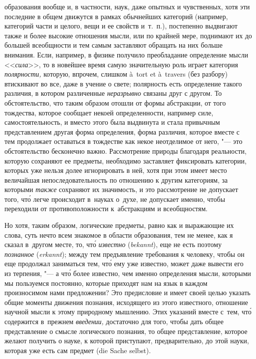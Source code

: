образования вообще и, в частности, наук, даже опытных и чувственных, хотя эти
последние в общем движутся в рамках обычнейших категорий (например, категорий
части и целого, вещи и ее свойств и~т.~п.), постепенно выдвигают также и более
высокие отношения мысли, или по крайней мере, поднимают их до большей
всеобщности и тем самым заставляют обращать на них больше внимания. Если,
например, в физике получило преобладание определение мысли <<{\em сила}>>, то в
новейшее время самую значительную роль играет категория {\em полярности,}
которую, впрочем, слишком à~tort et à~travers (без разбору) втискивают во все,
даже в учение о свете; полярность есть определение такого различия, в
котором различенные {\em неразрывно} связаны друг с другом. То обстоятельство,
что таким образом отошли от формы абстракции, от того тождества, которое
сообщает некоей определенности, например силе, самостоятельность, и вместо
этого была выдвинута и стала привычным представлением другая форма определения,
форма различия, которое вместе с тем продолжает оставаться в тождестве как
некое неотделимое от него, "--- это обстоятельство бесконечно важно.
Рассмотрение природы благодаря реальности, которую сохраняют ее предметы,
необходимо заставляет фиксировать категории, которых уже нельзя долее
игнорировать в ней, хотя при этом имеет место величайшая непоследовательность
по отношению к другим категориям, за которыми {\em также} сохраняют их
значимость, и это рассмотрение не допускает того, чт\'{о} легче происходит
в~науках о~духе, не допускает именно, чтобы переходили от противоположности
к~абстракциям и всеобщностям.

Но хотя, таким образом, логические предметы, равно как и выражающие их слова,
суть нечто всем знакомое в области образования, тем не менее, как я сказал
в~другом месте, то,
чт\'{о} {\em известно} ({\em bekannt}), еще не есть поэтому {\em познанное}
({\em erkannt}); между тем предъявление требования к человеку, чтобы он еще
продолжал заниматься тем, чт\'{о} ему уже известно, может даже вывести его из
терпения, "--- а чт\'{о} более известно, чем именно определения мысли, которыми
мы пользуемся постоянно, которые приходят нам на язык в каждом произносимом
нами предложении? Это предисловие и имеет своей целью указать общие моменты
движения познания, исходящего из этого известного, отношение научной мысли к
этому природному мышлению. Этих указаний вместе с~тем, чт\'{о} содержится
в~прежнем {\em введении,} достаточно для того, чтобы дать общее представление о
смысле логического познания, то общее представление, которое желают получить о
науке, к которой приступают, предварительно, до этой науки, которая уже есть
сам предмет (die Sache selbst).

